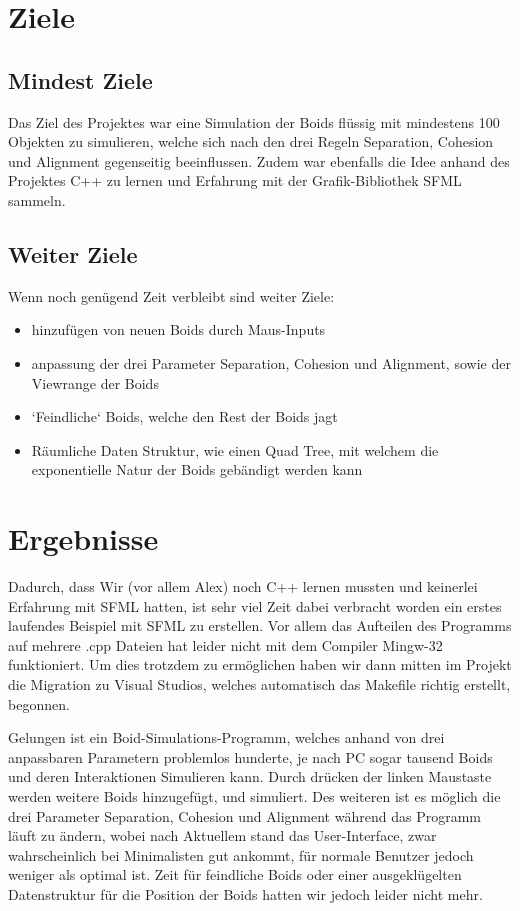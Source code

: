 \documentclass{article}
\begin{document}
    \section{Ziele}
    \subsection{Mindest Ziele}
        Das Ziel des Projektes war eine Simulation der Boids flüssig mit mindestens 100 Objekten zu simulieren, welche sich nach den drei Regeln Separation, Cohesion und Alignment gegenseitig beeinflussen. 
        Zudem war ebenfalls die Idee anhand des Projektes C++ zu lernen und Erfahrung mit der Grafik-Bibliothek SFML sammeln.
    
    \subsection{Weiter Ziele}
        Wenn noch genügend Zeit verbleibt sind weiter Ziele:
        \begin{itemize}
            \item hinzufügen von neuen Boids durch Maus-Inputs
            \item anpassung der drei Parameter Separation, Cohesion und Alignment, sowie der Viewrange der Boids
            \item ‘Feindliche‘ Boids, welche den Rest der Boids jagt
            \item Räumliche Daten Struktur, wie einen Quad Tree, mit welchem die exponentielle Natur der Boids gebändigt werden kann
        \end{itemize}
    
    
    \section{Ergebnisse}
    Dadurch, dass Wir (vor allem Alex) noch C++ lernen mussten und keinerlei Erfahrung mit SFML hatten, ist sehr viel Zeit dabei verbracht worden ein erstes laufendes Beispiel mit SFML zu erstellen. Vor allem das Aufteilen des Programms auf mehrere .cpp Dateien hat leider nicht mit dem Compiler Mingw-32 funktioniert. Um dies trotzdem zu ermöglichen haben wir dann mitten im Projekt die Migration zu Visual Studios, welches automatisch das Makefile richtig erstellt, begonnen. 
    
    Gelungen ist ein Boid-Simulations-Programm, welches anhand von drei anpassbaren Parametern problemlos hunderte, je nach PC sogar tausend Boids und deren Interaktionen Simulieren kann.
    Durch drücken der linken Maustaste werden weitere Boids hinzugefügt, und simuliert.
    Des weiteren ist es möglich die drei Parameter Separation, Cohesion und Alignment während das Programm läuft zu ändern, wobei nach Aktuellem stand das User-Interface, zwar wahrscheinlich bei Minimalisten gut ankommt, für normale Benutzer jedoch weniger als optimal ist.
    \newline Zeit für feindliche Boids oder einer ausgeklügelten Datenstruktur für die Position der Boids hatten wir jedoch leider nicht mehr.
    
\end{document}
